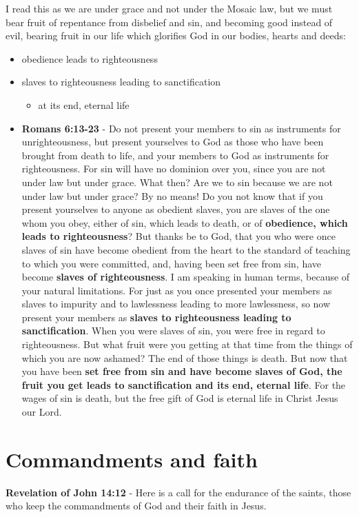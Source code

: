 \documentclass[11pt]{article}
\begin{document}
I read this as we are under grace and not
under the Mosaic law, but we must bear fruit
of repentance from disbelief and sin, and
becoming good instead of evil, bearing fruit
in our life which glorifies God in our bodies,
hearts and deeds:
\begin{itemize}
\item obedience leads to righteousness
\item slaves to righteousness leading to sanctification
\begin{itemize}
\item at its end, eternal life
\end{itemize}

\item \textbf{Romans 6:13-23} - Do not present your members to sin as instruments for unrighteousness, but present yourselves to God as those who have been brought from death to life, and your members to God as instruments for righteousness.  For sin will have no dominion over you, since you are not under law but under grace.  What then? Are we to sin because we are not under law but under grace? By no means!  Do you not know that if you present yourselves to anyone as obedient slaves, you are slaves of the one whom you obey, either of sin, which leads to death, or of \textbf{obedience, which leads to righteousness}?  But thanks be to God, that you who were once slaves of sin have become obedient from the heart to the standard of teaching to which you were committed, and, having been set free from sin, have become \textbf{slaves of righteousness}.  I am speaking in human terms, because of your natural limitations. For just as you once presented your members as slaves to impurity and to lawlessness leading to more lawlessness, so now present your members as \textbf{slaves to righteousness leading to sanctification}.  When you were slaves of sin, you were free in regard to righteousness.  But what fruit were you getting at that time from the things of which you are now ashamed? The end of those things is death.  But now that you have been \textbf{set free from sin and have become slaves of God, the fruit you get leads to sanctification and its end, eternal life}.  For the wages of sin is death, but the free gift of God is eternal life in Christ Jesus our Lord.
\end{itemize}

\section{Commandments and faith}
\label{sec:org79cfcff}
\textbf{Revelation of John 14:12} - Here is a call for the endurance of the saints, those who keep the commandments of God and their faith in Jesus.
\end{document}
